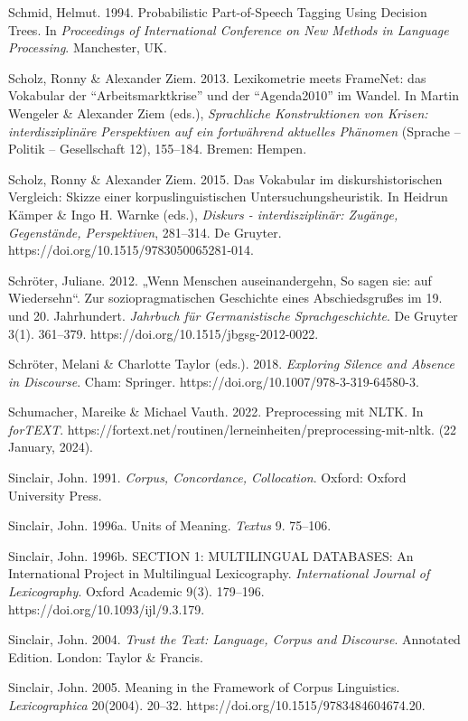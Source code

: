 Schmid, Helmut. 1994. Probabilistic Part-of-Speech Tagging Using Decision Trees. In \emph{Proceedings of International Conference on New Methods in Language Processing}. Manchester, UK.

Scholz, Ronny \& Alexander Ziem. 2013. Lexikometrie meets FrameNet: das Vokabular der ``Arbeitsmarktkrise'' und der ``Agenda2010'' im Wandel. In Martin Wengeler \& Alexander Ziem (eds.), \emph{Sprachliche Konstruktionen von Krisen: interdisziplinäre Perspektiven auf ein fortwährend aktuelles Phänomen} (Sprache -- Politik -- Gesellschaft 12), 155--184. Bremen: Hempen.

Scholz, Ronny \& Alexander Ziem. 2015. Das Vokabular im diskurshistorischen Vergleich: Skizze einer korpuslinguistischen Untersuchungsheuristik. In Heidrun Kämper \& Ingo H. Warnke (eds.), \emph{Diskurs - interdisziplinär: Zugänge, Gegenstände, Perspektiven}, 281--314. De Gruyter. https://doi.org/10.1515/9783050065281-014.

Schröter, Juliane. 2012. „Wenn Menschen auseinandergehn, So sagen sie: auf Wiedersehn``. Zur soziopragmatischen Geschichte eines Abschiedsgrußes im 19. und 20. Jahrhundert. \emph{Jahrbuch für Germanistische Sprachgeschichte}. De Gruyter 3(1). 361--379. https://doi.org/10.1515/jbgsg-2012-0022.

Schröter, Melani \& Charlotte Taylor (eds.). 2018. \emph{Exploring Silence and Absence in Discourse}. Cham: Springer. https://doi.org/10.1007/978-3-319-64580-3.

Schumacher, Mareike \& Michael Vauth. 2022. Preprocessing mit NLTK. In \emph{forTEXT}. https://fortext.net/routinen/lerneinheiten/preprocessing-mit-nltk. (22 January, 2024).

Sinclair, John. 1991. \emph{Corpus, Concordance, Collocation}. Oxford: Oxford University Press.

Sinclair, John. 1996a. Units of Meaning. \emph{Textus} 9. 75--106.

Sinclair, John. 1996b. SECTION 1: MULTILINGUAL DATABASES: An International Project in Multilingual Lexicography. \emph{International Journal of Lexicography}. Oxford Academic 9(3). 179--196. https://doi.org/10.1093/ijl/9.3.179.

Sinclair, John. 2004. \emph{Trust the Text: Language, Corpus and Discourse}. Annotated Edition. London: Taylor \& Francis.

Sinclair, John. 2005. Meaning in the Framework of Corpus Linguistics. \emph{Lexicographica} 20(2004). 20--32. https://doi.org/10.1515/9783484604674.20.

